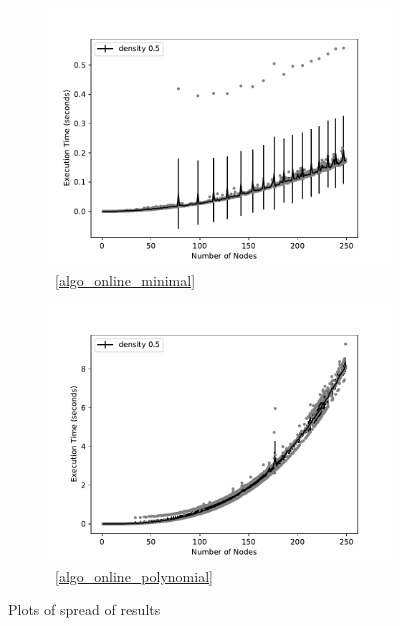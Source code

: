\documentclass[sigplan]{acmart}
\begin{document}
\begin{figure}
    \begin{subfigure}{\linewidth}
      \includegraphics[width=\linewidth]{variance_10_OptimalSet.pdf}
      \caption{~\ref{algo_online_minimal}}
      \label{fig:sfigOptimalSpread}
    \end{subfigure}

    \begin{subfigure}{\linewidth}
      \includegraphics[width=\linewidth]{variance_10_Polynomial.pdf}
      \caption{~\ref{algo_online_polynomial}}
      \label{fig:sfigPolynomialSpread}
    \end{subfigure}
    

    \caption{Plots of spread of results}
    \label{fig:variance}
\end{figure}
\end{document}
